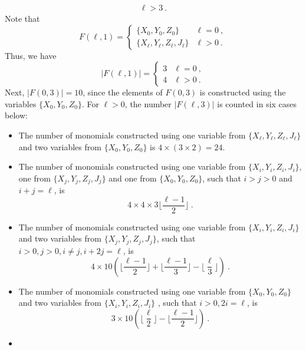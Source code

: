 \documentclass[a4paper,10pt]{article}
\begin{document}
\begin{appendix}
\begin{equation}
\begin{aligned}
\ell >3~.
\end{aligned}
\end{equation}
Note that 
\begin{equation}
F(\ell,1) = \begin{cases}
\{X_0,Y_0,Z_0\} & \ell = 0~,\\
 \{X_\ell, Y_\ell,Z_\ell, J_\ell\} & \ell >0~.
\end{cases}    
\end{equation}
Thus, we have
\begin{equation}
\label{eq:Fl1}
|F(\ell,1)| = \begin{cases}
3 & \ell = 0~,\\
4 & \ell >0~.
\end{cases}
\end{equation}
Next, $|F(0,3)| = 10$, since the elements of $F(0,3)$ is constructed using the variables $\{X_0, Y_0, Z_0\}$.
For $\ell>0$, the number $|F(\ell,3)|$ is counted in six cases below:
\begin{itemize}
\item
The number of monomials constructed  using one variable from $\{X_\ell,Y_\ell,Z_\ell,J_\ell\}$ and two variables from $\{X_0,Y_0,Z_0\}$ is $4\times(3\times 2)=24$.
\item
The number of monomials constructed using one variable from $\{X_i, Y_i,Z_i,J_i\}$, one from $\{X_j, Y_j,Z_j,J_j\}$ and one from $\{X_0,Y_0,Z_0\}$, such that $i>j>0$ and $i+j = \ell$, is 
\begin{equation}
    4\times 4 \times 3 \bigg\lfloor\frac{\ell-1}{2}\bigg\rfloor~.
\end{equation}
\item 
The number of monomials constructed using one variable from $\{X_i, Y_i,Z_i,J_i\}$ and two variables from $\{X_j, Y_j,Z_j,J_j\}$, such that $i >0, j>0,i\neq j, i + 2j = \ell$, is  
\begin{equation}
4 \times 10 \left(\bigg\lfloor \frac{\ell-1}{2}\bigg\rfloor+\bigg\lfloor \frac{\ell-1}{3}\bigg\rfloor - \bigg\lfloor \frac{\ell}{3}\bigg\rfloor\right)~.
\end{equation}
\item 
The number of monomials constructed using one variable from $\{X_0,Y_0,Z_0\}$ and two variables from  $\{X_i, Y_i,Z_i,J_i\}$ , such that $i>0, 2i = \ell$, is 
\begin{equation}
    3 \times 10\left(\bigg\lfloor \frac{\ell}{2}\bigg\rfloor - \bigg\lfloor \frac{\ell-1}{2}\bigg\rfloor \right)~.
\end{equation}
\item 

\end{itemize}
\end{appendix}
\end{document}
